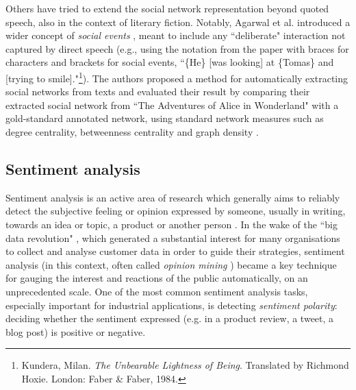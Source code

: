\documentclass[bsc,frontabs,singlespacing,parskip, twoside]{infthesis}
\begin{document}
Others have tried to extend the social network representation beyond quoted speech, also in the context of literary fiction. Notably, Agarwal et al. introduced a wider concept of \textit{social events} \cite{agarwal2010annotation}, meant to include any ``deliberate" interaction not captured by direct speech (e.g., using the notation from the paper with braces for characters and brackets for social events, ``\{He\} [was looking] at \{Tomas\} and [trying to smile]."\footnote{Kundera, Milan. \textit{The Unbearable Lightness of Being}. Translated by Richmond Hoxie. London: Faber \& Faber, 1984.}). The authors proposed a method for automatically extracting social networks from texts and evaluated their result  by comparing their extracted social network from ``The Adventures of Alice in Wonderland" with a gold-standard annotated network, using standard network measures such as degree centrality, betweenness centrality and graph density  \cite{Agarwal2013}.

\subsection{Sentiment analysis}
\label{sec:bg_sentiment}
Sentiment analysis is an active area of research which generally aims to reliably detect the subjective feeling or opinion expressed by someone, usually in writing, towards an idea or topic, a product or another person \cite{varghesesurvey}. In the wake of the ``big data revolution" \cite{mayer2013big}, which generated a substantial interest for many organisations to collect and analyse customer data in order to guide their strategies, sentiment analysis (in this context, often called \textit{opinion mining} \cite{pang2008opinion}) became a key technique for gauging the interest and reactions of the public automatically, on an unprecedented scale. One of the most common sentiment analysis tasks, especially important for industrial applications, is detecting \textit{sentiment polarity}: deciding whether the sentiment expressed (e.g. in a product review, a tweet, a blog post) is positive or negative.
\end{document}
